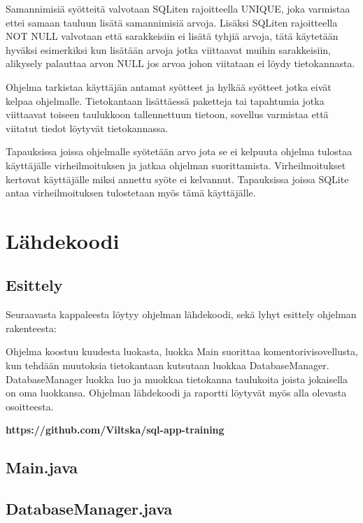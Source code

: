 \documentclass[11pt,a4paper]{article}
\begin{document}
Samannimisiä syötteitä valvotaan SQLiten rajoitteella UNIQUE, joka varmistaa ettei samaan tauluun lisätä samannimisiä arvoja. Lisäksi SQLiten rajoitteella NOT NULL valvotaan että sarakkeisiin ei lisätä tyhjiä arvoja, tätä käytetään hyväksi esimerkiksi kun lisätään arvoja jotka viittaavat muihin sarakkeisiin, alikysely palauttaa arvon NULL jos arvoa johon viitataan ei löydy tietokannasta.
 
Ohjelma tarkistaa käyttäjän antamat syötteet ja hylkää syötteet jotka eivät kelpaa ohjelmalle. Tietokantaan lisättäessä paketteja tai tapahtumia jotka viittaavat toiseen taulukkoon tallennettuun tietoon, sovellus varmistaa että viitatut tiedot löytyvät tietokannassa.

Tapauksissa joissa ohjelmalle syötetään arvo jota se ei kelpuuta ohjelma tulostaa käyttäjälle virheilmoituksen ja jatkaa ohjelman suorittamista. Virheilmoitukset kertovat käyttäjälle miksi annettu syöte ei kelvannut. Tapauksissa joissa SQLite antaa virheilmoituksen tulostetaan myös tämä käyttäjälle. 

\newpage
\section{Lähdekoodi}

\subsection*{Esittely}
Seuraavasta kappaleesta löytyy ohjelman lähdekoodi, sekä lyhyt esittely ohjelman rakenteesta:

Ohjelma koostuu kuudesta luokasta, luokka Main suorittaa komentorivisovellusta, kun tehdään muutoksia tietokantaan kutsutaan luokkaa DatabaseManager. DatabaseManager luokka luo ja muokkaa tietokanna taulukoita joista jokaisella on oma luokkansa. Ohjelman lähdekoodi ja raportti löytyvät myös alla olevasta osoitteesta.

\begin{center}
\textbf{https://github.com/Viltska/sql-app-training}
\end{center}
\newpage

\subsection*{Main.java}

\newpage

\subsection*{DatabaseManager.java}

\newpage
\end{document}

